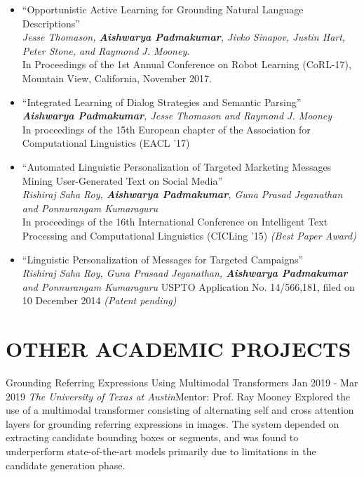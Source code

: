 \documentclass[letterpaper,10pt]{resume}
\begin{document}
{\begin{itemize}
\item  ``Opportunistic Active Learning for Grounding Natural Language Descriptions'' \\
\textit{Jesse Thomason, \textbf{Aishwarya Padmakumar}, Jivko Sinapov, Justin Hart, Peter Stone, and Raymond J. Mooney.} \\
In Proceedings of the 1st Annual Conference on Robot Learning (CoRL-17), Mountain View, California, November 2017. 
\vspace{0.2cm}

\item  ``Integrated Learning of Dialog Strategies and Semantic Parsing'' \\
\textit{\textbf{Aishwarya Padmakumar}, Jesse Thomason and Raymond J. Mooney} \\
In proceedings of the 15th European chapter of the Association for Computational Linguistics (EACL '17) 
\vspace{0.2cm}


\item  ``Automated Linguistic Personalization of Targeted Marketing Messages Mining User-Generated Text on Social Media'' \\
\textit{Rishiraj Saha Roy, \textbf{Aishwarya Padmakumar}, Guna Prasad Jeganathan and Ponnurangam Kumaraguru} \\
In proceedings of the 16th International Conference on Intelligent Text Processing and Computational Linguistics (CICLing ’15) \textit{(Best Paper Award)}
\vspace{0.2cm}

\item ``Linguistic Personalization of Messages for Targeted Campaigns'' \\
\textit{Rishiraj Saha Roy, Guna Prasaad Jeganathan, \textbf{Aishwarya Padmakumar} and Ponnurangam Kumaraguru}
USPTO Application No. 14/566,181, filed on 10 December 2014 \textit{(Patent pending)}
\vspace{0.2cm}
\end{itemize}

\section{OTHER ACADEMIC PROJECTS}
\begin{itemize}
  \credentialtwo
    {{Grounding Referring Expressions Using Multimodal Transformers}}
    {\sf Jan 2019 - Mar 2019}
    {\it The University of Texas at Austin}{\textsf{Mentor: Prof. Ray Mooney}}
    {}
    { 
    \small 
    Explored the use of a multimodal transformer consisting of alternating self and cross attention layers for grounding referring expressions in images. The system depended on extracting candidate bounding boxes or segments, and was found to underperform state-of-the-art models primarily due to limitations in the candidate generation phase. 
    }
   \vspace{0.2cm}



\end{itemize}}
\end{document}
